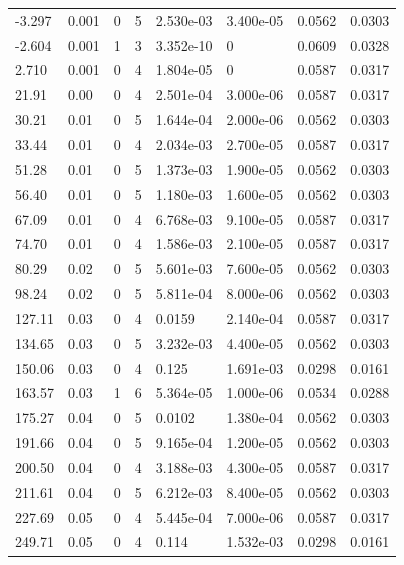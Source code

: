 \documentclass[preview]{standalone}
\begin{document}
{{\begin{tabular}{L{1.2cm}C{1.2cm} C{0.3cm}C{0.5cm} C{1.4cm}C{1.4cm} C{1.4cm}C{1.4cm}}
  -3.297  &  0.001  & 0     &  5 &  2.530e-03  & 3.400e-05  & 0.0562 &  0.0303   \\ 
  -2.604  &  0.001  & 1     &  3 &  3.352e-10  & 0  & 0.0609 &  0.0328   \\ 
  2.710  &  0.001  & 0     &  4 &  1.804e-05  & 0  & 0.0587 &  0.0317   \\ 
  21.91  &  0.00  & 0     &  4 &  2.501e-04  & 3.000e-06  & 0.0587 &  0.0317   \\ 
  30.21  &  0.01  & 0     &  5 &  1.644e-04  & 2.000e-06  & 0.0562 &  0.0303   \\ 
  33.44  &  0.01  & 0     &  4 &  2.034e-03  & 2.700e-05  & 0.0587 &  0.0317   \\ 
  51.28  &  0.01  & 0     &  5 &  1.373e-03  & 1.900e-05  & 0.0562 &  0.0303   \\ 
  56.40  &  0.01  & 0     &  5 &  1.180e-03  & 1.600e-05  & 0.0562 &  0.0303   \\ 
  67.09  &  0.01  & 0     &  4 &  6.768e-03  & 9.100e-05  & 0.0587 &  0.0317   \\ 
  74.70  &  0.01  & 0     &  4 &  1.586e-03  & 2.100e-05  & 0.0587 &  0.0317   \\ 
  80.29  &  0.02  & 0     &  5 &  5.601e-03  & 7.600e-05  & 0.0562 &  0.0303   \\ 
  98.24  &  0.02  & 0     &  5 &  5.811e-04  & 8.000e-06  & 0.0562 &  0.0303   \\ 
  127.11  &  0.03  & 0     &  4 &  0.0159  & 2.140e-04  & 0.0587 &  0.0317   \\ 
  134.65  &  0.03  & 0     &  5 &  3.232e-03  & 4.400e-05  & 0.0562 &  0.0303   \\ 
  150.06  &  0.03  & 0     &  4 &  0.125  & 1.691e-03  & 0.0298 &  0.0161   \\ 
  163.57  &  0.03  & 1     &  6 &  5.364e-05  & 1.000e-06  & 0.0534 &  0.0288   \\ 
  175.27  &  0.04  & 0     &  5 &  0.0102  & 1.380e-04  & 0.0562 &  0.0303   \\ 
  191.66  &  0.04  & 0     &  5 &  9.165e-04  & 1.200e-05  & 0.0562 &  0.0303   \\ 
  200.50  &  0.04  & 0     &  4 &  3.188e-03  & 4.300e-05  & 0.0587 &  0.0317   \\ 
  211.61  &  0.04  & 0     &  5 &  6.212e-03  & 8.400e-05  & 0.0562 &  0.0303   \\ 
  227.69  &  0.05  & 0     &  4 &  5.445e-04  & 7.000e-06  & 0.0587 &  0.0317   \\ 
  249.71  &  0.05  & 0     &  4 &  0.114  & 1.532e-03  & 0.0298 &  0.0161   \\ 

\end{tabular}}}
\end{document}

